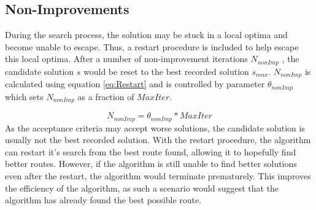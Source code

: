 \subsection{Non-Improvements}
During the search process, the solution may be stuck in a local optima and become unable to escape. Thus, a restart procedure is included to help escape this local optima. After a number of non-improvement iterations $N_{nonImp}$ , the candidate solution $s$ would be reset to the best recorded solution $s_{max}$. $N_{nonImp}$ is calculated using equation \ref{eq:Restart} and is controlled by parameter $\theta_{nonImp}$ which sets $N_{nonImp}$ as a fraction of $MaxIter$.

\begin{equation} \label{eq:Restart}
N_{nonImp} = \theta_{nonImp} * MaxIter
\end{equation}
As the acceptance criteria may accept worse solutions, the candidate solution is usually not the best recorded solution. With the restart procedure, the algorithm can restart it's search from the best route found, allowing it to hopefully find better routes. However, if the algorithm is still unable to find better solutions even after the restart, the algorithm would terminate prematurely. This improves the efficiency of the algorithm, as such a scenario would suggest that the algorithm has already found the best possible route.